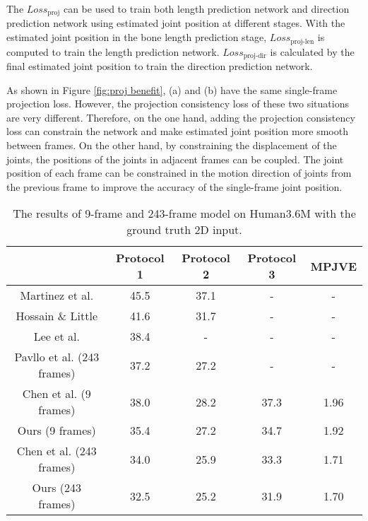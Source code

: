 \documentclass[journal]{IEEEtran}
\begin{document}
The $Loss_{\text{proj}}$ can be used to train both length prediction network and direction prediction network using estimated joint position at different stages. With the estimated joint position in the bone length prediction stage, $Loss_{\text{proj-len}}$ is computed to train the length prediction network. $ Loss_{\text{proj-dir}} $ is calculated by the final estimated joint position to train the direction prediction network. 

As shown in Figure \ref{fig:proj benefit}, (a) and (b) have the same single-frame projection loss. However,  the projection consistency loss of these two situations are very different. Therefore, on the one hand, adding the projection consistency loss can constrain the network and make estimated joint position more smooth between frames. On the other hand, by constraining the displacement of the joints, the positions of the joints in adjacent frames can be coupled. The joint position of each frame can be constrained in the motion direction of joints from the previous frame to improve the accuracy of the single-frame joint position.


\begin{table}[t]
	\centering
\resizebox{1.00\columnwidth}{!}
	{
		\begin{tabular}{|c|c|c|c|c|}
			\hline
			& Protocol 1 & Protocol 2 & Protocol 3 & MPJVE \\ \hline
			Martinez et al. \cite{Martinez_2017_ICCV}  & 45.5  & 37.1 & - & - \\
			Hossain \& Little \cite{hossain2018exploiting} & 41.6 & 31.7 & -  & - \\
			Lee et al. \cite{2018Propagating} &38.4 & - & - & - \\
			Pavllo et al.  \cite{20183D} (243 frames) &37.2  & 27.2 & - & - \\ \hline 
			Chen et al.  \cite{2020Anatomy} (9 frames)   & 38.0       & 28.2       & 37.3       & 1.96     \\
			Ours (9 frames)          & 35.4       & 27.2       & 34.7       & 1.92     \\ \hline
			Chen et al.  \cite{2020Anatomy} (243 frames) & 34.0       & 25.9       & 33.3       & 1.71     \\
			Ours (243 frames)        & 32.5       & 25.2       & 31.9       & 1.70     \\ \hline
		\end{tabular}
	}
	\vspace{-0pt}
	\caption{The results of 9-frame and 243-frame model on Human3.6M with the ground truth 2D input.}
	\label{table:gt}
	\vspace{-0pt}
\end{table} 
\end{document}
